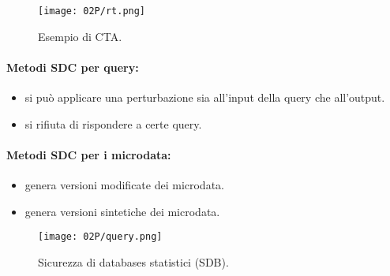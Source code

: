 \begin{figure}[h]
    \centering
    \texttt{[image: 02P/rt.png]}
    \caption{Esempio di CTA.}
    \label{fig:rt}
\end{figure}

\paragraph{Metodi SDC per query:}

\begin{itemize}
  \item {} si può applicare una perturbazione sia all'input della query che all'output.
  \item {} si rifiuta di rispondere a certe query.
\end{itemize}

\paragraph{Metodi SDC per i microdata:}

\begin{itemize}
  \item {} genera versioni modificate dei microdata.
  \item {} genera versioni sintetiche dei microdata.
\end{itemize}

\begin{figure}[h]
    \centering
    \texttt{[image: 02P/query.png]}
    \caption{Sicurezza di databases statistici (SDB).}
\end{figure}

